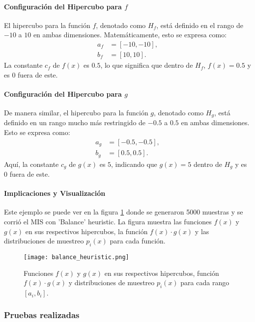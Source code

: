 \documentclass{article}
\begin{document}
\paragraph{Configuración del Hipercubo para \( f \)}
El hipercubo para la función \( f \), denotado como \( H_f \), está definido en el rango de \(-10\) a \(10\) en ambas dimensiones. Matemáticamente, esto se expresa como:
\begin{align*}
    a_f &= [-10, -10], \\
    b_f &= [10, 10].
\end{align*}
La constante \( c_f \) de \( f(x) \) es \( 0.5 \), lo que significa que dentro de \( H_f \), \( f(x) = 0.5 \) y es \( 0 \) fuera de este.

\paragraph{Configuración del Hipercubo para \( g \)}
De manera similar, el hipercubo para la función \( g \), denotado como \( H_g \), está definido en un rango mucho más restringido de \(-0.5\) a \(0.5\) en ambas dimensiones. Esto se expresa como:
\begin{align*}
    a_g &= [-0.5, -0.5], \\
    b_g &= [0.5, 0.5].
\end{align*}
Aquí, la constante \( c_g \) de \( g(x) \) es \( 5 \), indicando que \( g(x) = 5 \) dentro de \( H_g \) y es \( 0 \) fuera de este.

\paragraph{Implicaciones y Visualización}
Este ejemplo se puede ver en la figura \ref{fig:mis3} donde se generaron 5000 muestras y se corrió el MIS con 'Balance' heuristic.
La figura muestra las funciones \( f(x) \) y \( g(x) \) en sus respectivos hipercubos, la función \( f(x) \cdot g(x) \) y las distribuciones de muestreo \( p_{i}(x) \) para cada función.

\begin{figure}[H]
\texttt{[image: balance\_heuristic.png]}
\caption{Funciones \( f(x) \) y \( g(x) \) en sus respectivos hipercubos, función \( f(x) \cdot g(x) \) y distribuciones de muestreo \( p_{i}(x) \) para cada rango \( [a_{i}, b_{i}] \).}
\label{fig:mis3}
\end{figure}

\subsubsection{Pruebas realizadas}
\end{document}
